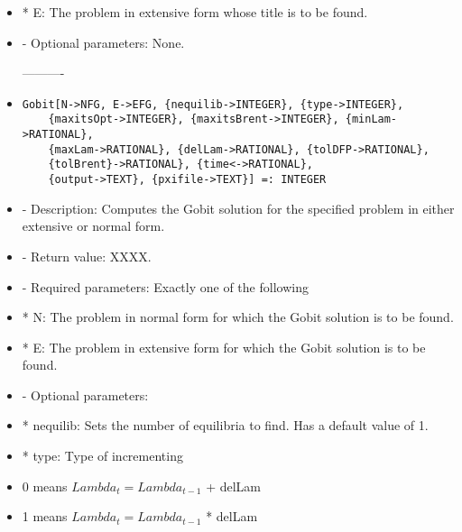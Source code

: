 \begin{itemize}
\bd
\item
*  E:  The problem in extensive form whose title is to be found.
\ed

\item
- Optional parameters:  None.
\ed

----------

\item
\begin{verbatim}
Gobit[N->NFG, E->EFG, {nequilib->INTEGER}, {type->INTEGER},
	{maxitsOpt->INTEGER}, {maxitsBrent->INTEGER}, {minLam->RATIONAL},
	{maxLam->RATIONAL}, {delLam->RATIONAL}, {tolDFP->RATIONAL},
	{tolBrent}->RATIONAL}, {time<->RATIONAL}, 
	{output->TEXT}, {pxifile->TEXT}] =: INTEGER
\end{verbatim}

\bd
\item
- Description:  Computes the Gobit solution for the specified problem in
either extensive or normal form.  
\item
- Return value:  XXXX.
\item 
- Required parameters:  Exactly one of the following

\bd
\item
*  N:  The problem in normal form for which the Gobit solution is to
be found.
\item	
*  E:  The problem in extensive form for which the Gobit solution 
is to be found.
\ed

\item
- Optional parameters:

\bd
\item
*  nequilib:  Sets the number of equilibria to find.  Has a default 
value of 1.  
\item
*  type:   Type of incrementing 
	
\bd
\item
0 means $Lambda_t = Lambda_{t-1}$ + delLam
\item 
1 means $Lambda_t = Lambda_{t-1}$ * delLam
\ed


\end{itemize}
